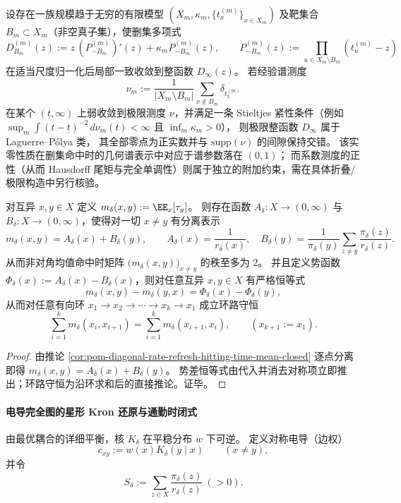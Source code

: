 \begin{conjecture}\label{conj:pom-diagonal-rate-refresh-deleted-laguerre-lp-closure}
设存在一族规模趋于无穷的有限模型
\(
(X_m,\kappa_m,\{t_x^{(m)}\}_{x\in X_m})
\)
及靶集合 \(B_m\subset X_m\)（非空真子集），使删集多项式
\[
D_{B_m}^{(m)}(z):=z\,(P_{-B_m}^{(m)})'(z)+\kappa_m P_{-B_m}^{(m)}(z),
\qquad
P_{-B_m}^{(m)}(z):=\prod_{u\in X_m\setminus B_m}(t_u^{(m)}-z)
\]
在适当尺度归一化后局部一致收敛到整函数 \(D_\infty(z)\)。
若经验谱测度
\[
\nu_m:=\frac{1}{|X_m\setminus B_m|}\sum_{x\notin B_m}\delta_{t_x^{(m)}}
\]
在某个 \((\underline t,\infty)\) 上弱收敛到极限测度 \(\nu\)，并满足一条 Stieltjes 紧性条件（例如 \(\sup_m\int (t-\underline t)^{-2}\,d\nu_m(t)<\infty\) 且 \(\inf_m\kappa_m>0\)），
则极限整函数 \(D_\infty\) 属于 Laguerre--P\'olya 类，
其全部零点为正实数并与 \(\mathrm{supp}(\nu)\) 的间隙保持交错。
该实零性质在删集命中时的几何谱表示中对应于谱参数落在 \((0,1)\)；
而系数测度的正性（从而 Hausdorff 尾矩与完全单调性）则属于独立的附加约束，需在具体折叠/极限构造中另行核验。
\end{conjecture}

\begin{proposition}[有向命中时的秩二分解与势差闭合]\label{prop:pom-diagonal-rate-refresh-hitting-time-rank-two-potential}
对互异 \(x,y\in X\) 定义
\(
m_\delta(x,y):=\EE_x[\tau_y]
\)。
则存在函数 \(A_\delta:X\to(0,\infty)\) 与 \(B_\delta:X\to(0,\infty)\)，使得对一切 \(x\ne y\) 有分离表示
\[
m_\delta(x,y)=A_\delta(x)+B_\delta(y),
\qquad
A_\delta(x)=\frac{1}{r_\delta(x)},
\quad
B_\delta(y)=\frac{1}{\pi_\delta(y)}\sum_{z\ne y}\frac{\pi_\delta(z)}{r_\delta(z)}.
\]
从而非对角均值命中时矩阵 \(\bigl(m_\delta(x,y)\bigr)_{x\ne y}\) 的秩至多为 \(2\)。
并且定义势函数 \(\Phi_\delta(x):=A_\delta(x)-B_\delta(x)\)，则对任意互异 \(x,y\in X\) 有严格恒等式
\[
m_\delta(x,y)-m_\delta(y,x)=\Phi_\delta(x)-\Phi_\delta(y),
\]
从而对任意有向环 \(x_1\to x_2\to\cdots\to x_k\to x_1\) 成立环路守恒
\[
\sum_{i=1}^{k} m_\delta(x_i,x_{i+1})=\sum_{i=1}^{k} m_\delta(x_{i+1},x_i),
\qquad (x_{k+1}:=x_1).
\]
\end{proposition}
\begin{proof}
由推论 \ref{cor:pom-diagonal-rate-refresh-hitting-time-mean-closed} 逐点分离即得 \(m_\delta(x,y)=A_\delta(x)+B_\delta(y)\)。
势差恒等式由代入并消去对称项立即推出；环路守恒为沿环求和后的直接推论。证毕。
\end{proof}

\paragraph{电导完全图的星形 Kron 还原与通勤时闭式}
由最优耦合的详细平衡，核 \(K_\delta\) 在平稳分布 \(w\) 下可逆。
定义对称电导（边权）
\[
c_{xy}:=w(x)K_\delta(y\mid x)\qquad(x\ne y),
\]
并令
\[
S_\delta:=\sum_{z\in X}\frac{\pi_\delta(z)}{r_\delta(z)}\ (>0).
\]

